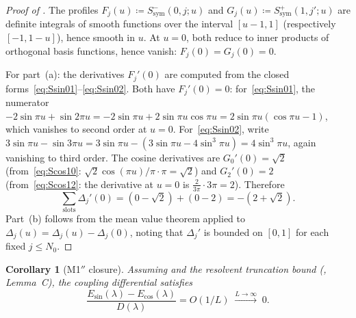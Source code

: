 \documentclass[12pt,a4paper]{article}
\newtheorem{corollary}[theorem]{Corollary}
\theoremstyle{definition}
\theoremstyle{remark}
\begin{document}
\begin{proof}[Proof of ]
The profiles $F_j(u) \coloneqq S^-_{\mathrm{sym}}(0,j;u)$ and $G_j(u) \coloneqq S^+_{\mathrm{sym}}(1,j';u)$ are definite integrals of smooth functions over the interval $[u-1,1]$ (respectively $[-1,1-u]$), hence smooth in $u$. At $u = 0$, both reduce to inner products of orthogonal basis functions, hence vanish: $F_j(0) = G_j(0) = 0$.

For part~(a): the derivatives $F_j'(0)$ are computed from the closed forms~\eqref{eq:Ssin01}--\eqref{eq:Ssin02}. Both have $F_j'(0) = 0$: for~\eqref{eq:Ssin01}, the numerator $-2\sin\pi u + \sin 2\pi u = -2\sin\pi u + 2\sin\pi u\cos\pi u = 2\sin\pi u(\cos\pi u - 1)$, which vanishes to second order at $u = 0$. For~\eqref{eq:Ssin02}, write $3\sin\pi u - \sin 3\pi u = 3\sin\pi u - (3\sin\pi u - 4\sin^3\pi u) = 4\sin^3\pi u$, again vanishing to third order. The cosine derivatives are $G_0'(0) = \sqrt{2}$ (from~\eqref{eq:Scos10}: $\sqrt{2}\cos(\pi u)/\pi \cdot \pi = \sqrt{2}$) and $G_2'(0) = 2$ (from~\eqref{eq:Scos12}: the derivative at $u = 0$ is $\tfrac{2}{3\pi}\cdot 3\pi = 2$). Therefore
\[
  \sum_{\mathrm{slots}} \Delta_j'(0) = (0 - \sqrt{2}) + (0 - 2) = -(2 + \sqrt{2}).
\]
Part~(b) follows from the mean value theorem applied to $\Delta_j(u) = \Delta_j(u) - \Delta_j(0)$, noting that $\Delta_j'$ is bounded on $[0,1]$ for each fixed $j \leq N_0$.
\end{proof}

\begin{corollary}[M1$''$ closure]
\label{cor:M1-closure}
Assuming  and the resolvent truncation bound (, Lemma~C), the coupling differential satisfies
\[
  \frac{E_{\sin}(\lambda) - E_{\cos}(\lambda)}{D(\lambda)} = O(1/L) \;\xrightarrow{L \to \infty}\; 0.
\]
\end{corollary}
\end{document}
